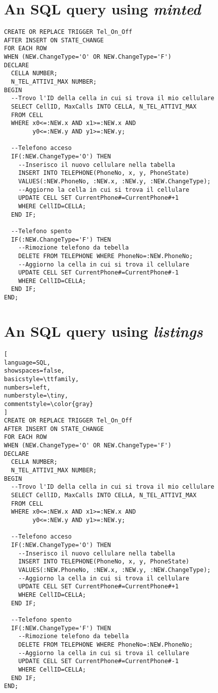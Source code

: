 \documentclass[a4paper]{article}
\begin{document}
\section*{An SQL query using \emph{minted}}
\begin{verbatim}
CREATE OR REPLACE TRIGGER Tel_On_Off
AFTER INSERT ON STATE_CHANGE
FOR EACH ROW
WHEN (NEW.ChangeType='O' OR NEW.ChangeType='F')
DECLARE
  CELLA NUMBER;
  N_TEL_ATTIVI_MAX NUMBER;
BEGIN
  --Trovo l'ID della cella in cui si trova il mio cellulare
  SELECT CellID, MaxCalls INTO CELLA, N_TEL_ATTIVI_MAX
  FROM CELL
  WHERE x0<=:NEW.x AND x1>=:NEW.x AND
        y0<=:NEW.y AND y1>=:NEW.y;
        
  --Telefono acceso
  IF(:NEW.ChangeType='O') THEN
    --Inserisco il nuovo cellulare nella tabella
    INSERT INTO TELEPHONE(PhoneNo, x, y, PhoneState)
    VALUES(:NEW.PhoneNo, :NEW.x, :NEW.y, :NEW.ChangeType);
    --Aggiorno la cella in cui si trova il cellulare
    UPDATE CELL SET CurrentPhone#=CurrentPhone#+1
    WHERE CellID=CELLA;
  END IF;
  
  --Telefono spento
  IF(:NEW.ChangeType='F') THEN
    --Rimozione telefono da tebella
    DELETE FROM TELEPHONE WHERE PhoneNo=:NEW.PhoneNo;
    --Aggiorno la cella in cui si trova il cellulare
    UPDATE CELL SET CurrentPhone#=CurrentPhone#-1
    WHERE CellID=CELLA;
  END IF; 
END;
\end{verbatim}

\newpage
\section*{An SQL query using \emph{listings}}
\begin{lstlisting}[
language=SQL,
showspaces=false,
basicstyle=\ttfamily,
numbers=left,
numberstyle=\tiny,
commentstyle=\color{gray}
]
CREATE OR REPLACE TRIGGER Tel_On_Off
AFTER INSERT ON STATE_CHANGE
FOR EACH ROW
WHEN (NEW.ChangeType='O' OR NEW.ChangeType='F')
DECLARE
  CELLA NUMBER;
  N_TEL_ATTIVI_MAX NUMBER;
BEGIN
  --Trovo l'ID della cella in cui si trova il mio cellulare
  SELECT CellID, MaxCalls INTO CELLA, N_TEL_ATTIVI_MAX
  FROM CELL
  WHERE x0<=:NEW.x AND x1>=:NEW.x AND
        y0<=:NEW.y AND y1>=:NEW.y;
        
  --Telefono acceso
  IF(:NEW.ChangeType='O') THEN
    --Inserisco il nuovo cellulare nella tabella
    INSERT INTO TELEPHONE(PhoneNo, x, y, PhoneState)
    VALUES(:NEW.PhoneNo, :NEW.x, :NEW.y, :NEW.ChangeType);
    --Aggiorno la cella in cui si trova il cellulare
    UPDATE CELL SET CurrentPhone#=CurrentPhone#+1
    WHERE CellID=CELLA;
  END IF;
  
  --Telefono spento
  IF(:NEW.ChangeType='F') THEN
    --Rimozione telefono da tebella
    DELETE FROM TELEPHONE WHERE PhoneNo=:NEW.PhoneNo;
    --Aggiorno la cella in cui si trova il cellulare
    UPDATE CELL SET CurrentPhone#=CurrentPhone#-1
    WHERE CellID=CELLA;
  END IF; 
END;
\end{lstlisting}
\end{document}
